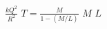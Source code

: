 \documentclass{article}
\begin{document}
$\frac{kQ^2}{R^2}$
$T = \frac{M}{1-(M/L)}$
$M$
$L$
\end{document}
